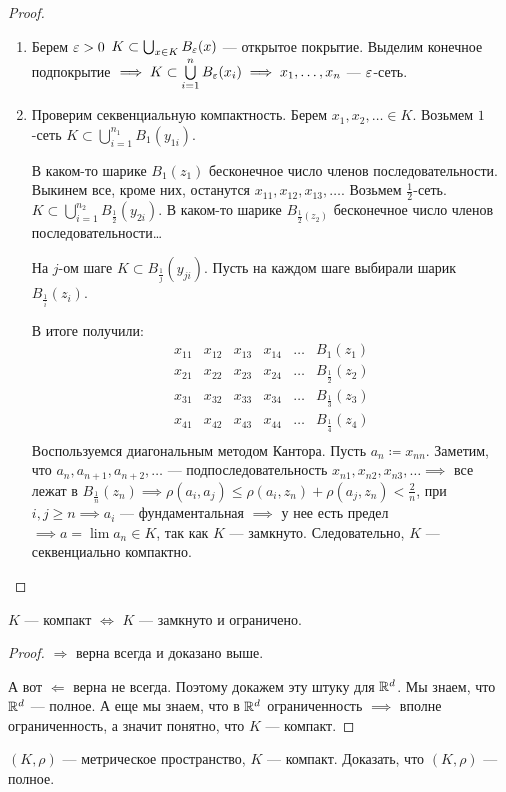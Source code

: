 \begin{proof}
    \begin{enumerate}
        \item Берем $\varepsilon > 0$  $K \subset \bigcup_{x \in K} B_\varepsilon(x)$ --- открытое покрытие. Выделим конечное подпокрытие  $\implies K \subset \bigcup\limits_{i=1}^n B_\varepsilon(x_i) \implies x_1, \ldots, x_n$  --- $\varepsilon$-сеть.
        \item Проверим секвенциальную компактность. Берем  $x_1, x_2, \ldots \in K$. Возьмем $1$-сеть  $K \subset \bigcup_{i=1}^{n_1} B_1(y_{1i})$.

            В каком-то шарике $B_1(z_1)$ бесконечное число членов последовательности. Выкинем все, кроме них, останутся  $x_{11}, x_{12}, x_{13},\ldots$. Возьмем $\frac{1}{2}$-сеть. $K \subset \bigcup\limits_{i=1}^{n_2} B_{\frac{1}{2}}(y_{2i})$. В каком-то шарике $B_{\frac{1}{2}(z_2)}$ бесконечное число членов последовательности\dots

            На $j$-ом шаге  $K \subset B_{\frac{1}{j}}(y_{ji})$. Пусть на каждом шаге выбирали шарик $B_{\frac{1}{i}}(z_i)$.

            В итоге получили:
            \[
            \begin{array}{cccccc}
                x_{11} & x_{12} & x_{13} & x_{14} & \ldots & B_1(z_1)\\
                x_{21} & x_{22} & x_{23} & x_{24} & \ldots & B_{\frac{1}{2}}(z_2)\\
                x_{31} & x_{32} & x_{33} & x_{34} & \ldots & B_{\frac{1}{3}}(z_3)\\
                x_{41} & x_{42} & x_{43} & x_{44} & \ldots & B_{\frac{1}{4}}(z_4)\\
            \end{array}            \] 
            Воспользуемся диагональным методом Кантора. Пусть $a_n \coloneqq x_{nn}$. Заметим, что  $a_n, a_{n+1}, a_{n+2},\ldots$ --- подпоследовательность  $x_{n1}, x_{n 2}, x_{n 3},\ldots \implies$ все лежат в $B_{\frac{1}{n}}(z_n) \implies \rho(a_i, a_j) \le \rho(a_i, z_n) + \rho(a_j, z_n) < \frac{2}{n}$, при $i, j \ge n \implies a_i$ --- фундаментальная $\implies$ у нее есть предел  $\implies a = \lim a_n \in K$,  так как $K$ --- замкнуто. Следовательно,  $K$ --- секвенциально компактно.
    \end{enumerate}
\end{proof}
\begin{consequence}
    $K$ --- компакт  $\iff$  $K$ --- замкнуто и ограничено. 
\end{consequence}
\begin{proof}
    $\Rightarrow$ верна всегда и доказано выше.

    А вот  $\Leftarrow$ верна не всегда. Поэтому докажем эту штуку для  $\mathbb{R}^d$. Мы знаем, что  $\mathbb{R}^d$ --- полное. А еще мы знаем, что в  $\mathbb{R}^d$ ограниченность  $\implies$ вполне ограниченность, а значит понятно, что  $K$ --- компакт.
\end{proof}
\begin{exerc}
    $(K, \rho)$ --- метрическое пространство,  $K$ --- компакт. Доказать, что  $(K, \rho)$ --- полное.
\end{exerc}

